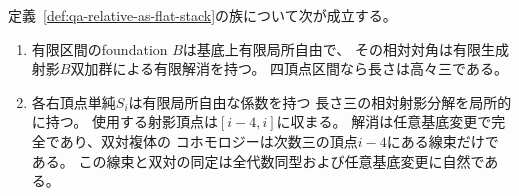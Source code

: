 \begin{proposition}[有限foundationの対角と相対単純の分解]
\label{prop:qa-relative-as-perfectness-automatic}
定義~\ref{def:qa-relative-as-flat-stack}の族について次が成立する。
\begin{enumerate}
\item 有限区間のfoundation $B$は基底上有限局所自由で、
その相対対角は有限生成射影$B$双加群による有限解消を持つ。
四頂点区間なら長さは高々三である。
\item 各右頂点単純$S_i$は有限局所自由な係数を持つ
長さ三の相対射影分解を局所的に持つ。
使用する射影頂点は$[i-4,i]$に収まる。
解消は任意基底変更で完全であり、双対複体の
コホモロジーは次数三の頂点$i-4$にある線束だけである。
この線束と双対の同定は全代数同型および任意基底変更に自然である。
\end{enumerate}
\end{proposition}

